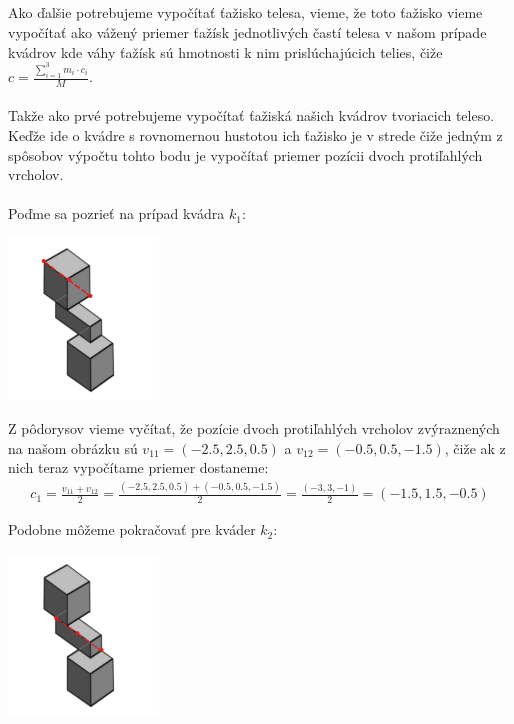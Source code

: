 \documentclass[a4paper]{article}
\begin{document}
	\subsection{}
	
	Ako ďalšie potrebujeme vypočítať ťažisko telesa, vieme, že toto ťažisko vieme vypočítať ako vážený priemer ťažísk jednotlivých častí telesa v našom prípade kvádrov kde váhy ťažísk sú hmotnosti k nim prislúchajúcich telies, čiže $c = \frac{\sum_{i=1}^{3} m_i \cdot c_i}{M}$.
	\\
	\\
	Takže ako prvé potrebujeme vypočítať ťažiská našich kvádrov tvoriacich teleso. Keďže ide o kvádre s rovnomernou hustotou ich ťažisko je v strede čiže jedným z spôsobov výpočtu tohto bodu je vypočítať priemer pozícii dvoch protiľahlých vrcholov.
	\\
	\\
	Poďme sa pozrieť na prípad kvádra $k_1$:
	
	\centerline{\includegraphics[width=0.3\textwidth]{taz_k_1}} 
	
	Z pôdorysov vieme vyčítať, že pozície dvoch protiľahlých vrcholov zvýraznených na našom obrázku sú $v_11 = (-2.5, 2.5, 0.5)$ a $v_12 = (-0.5, 0.5, -1.5)$, čiže ak z nich teraz vypočítame priemer dostaneme:
	\begin{align*}
		c_1 = \frac{v_11 + v_12}{2} = \frac{(-2.5, 2.5, 0.5) + (-0.5, 0.5, -1.5)}{2} = \frac{(-3, 3, -1)}{2} = (-1.5, 1.5, -0.5)
	\end{align*}

	Podobne môžeme pokračovať pre kváder $k_2$:
	
	\centerline{\includegraphics[width=0.3\textwidth]{taz_k_2}}
\end{document}
